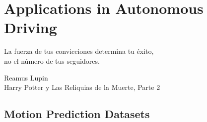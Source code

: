 % 
% 
% 
% 
% 
% 
% 

\chapter{Applications in Autonomous Driving}
\label{cha:applications_in_autonomous_driving}

\begin{FraseCelebre}
	\begin{Frase}
		La fuerza de tus convicciones determina tu éxito, \\
		no el número de tus seguidores.
	\end{Frase}
	\begin{Fuente}
		Reamus Lupin \\
		Harry Potter y Las Reliquias de la Muerte, Parte 2
	\end{Fuente}
\end{FraseCelebre}


\section{Motion Prediction Datasets}
\label{sec:5_datasets}

